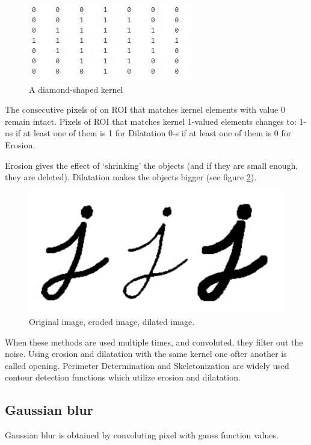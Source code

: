 \documentclass[12pt,twoside,a4paper]{article}
\begin{document}
 
\begin{figure}[H]
\centering
\includegraphics[width=0.4\paperwidth]{diam}
\caption{A diamond-shaped kernel\cite{morph}}\label{fig:diam}
\end{figure}

The consecutive pixels of on ROI that matches kernel elements with value 0 remain intact.
Pixels of ROI that matches kernel 1-valued elements changes to:
1-ns if at least one of them is 1 for Dilatation
0-s if at least one of them is 0 for Erosion.

Erosion gives the effect of ‘shrinking’ the objects (and if they are small enough, they are deleted).
Dilatation makes the objects bigger (see figure \ref{fig:lett}).

 
\begin{figure}[H]
\centering
\includegraphics[width=0.4\paperwidth]{lett}
\caption{Original image, eroded image, dilated image.\cite{erdil}}\label{fig:lett}
\end{figure}


When these methods are used multiple times, and convoluted, they filter out the noise.
Using erosion and dilatation with the same kernel one ofter another is called opening.
Perimeter Determination and Skeletonization are widely used contour detection functions which utilize erosion and dilatation\cite{erdil}.


\subsection{Gaussian blur}

Gaussian blur is obtained by convoluting pixel with gauss function values. 
\end{document}
